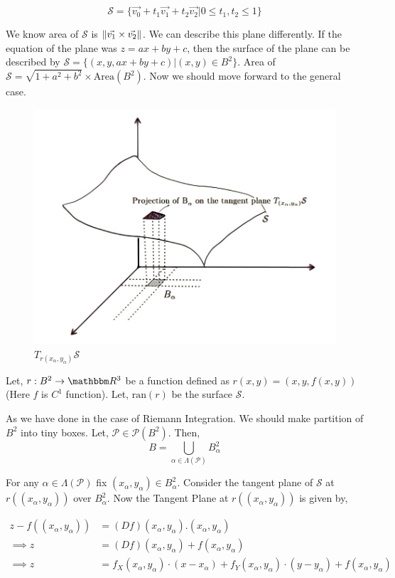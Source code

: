 \documentclass[../Analysis-3]{subfiles}
\begin{document}
$$ \mathcal{S} = \{ \vec{v_0} + t_1 \vec{v_1} +t_2 \vec{v_2}  |  0 \le t_1,t_2 \le 1\} $$

We know area of $\mathcal{S}$ is $\norm{\vec{v_1}\times \vec{v_2}}$. We can describe this plane differently. If the equation of the plane was $z=ax+by+c$, then the surface of the plane can be described by $\mathcal{S} = \{(x, y, ax+by+c) | (x,y) \in B^2 \}$. Area of $\mathcal{S} = \sqrt{1+a^2+b^2} \times \text{Area}(B^2)$. Now we should move forward to the general case.

\begin{figure}
    \centering
    \includegraphics[width=.78\linewidth]{../figures/lec-25.2.png}
    \caption{$T_{r(x_{\alpha},y_{\alpha})} \mathcal{S}$}
\end{figure}


Let, $r : B^2 \to \R^3$ be a function defined as $r(x,y) = (x,y,f(x,y))$ (Here $f$ is $C^1$ function). Let, $\text{ran}(r)$ be the surface $\mathcal{S}$.

\vspace{0.2cm}

As we have done in the case of Riemann Integration. We should make partition of $B^2$ into tiny boxes.  Let, $\mathcal{P} \in \mathscr{P}(B^2)$. Then,
\[B = \bigcup_{\alpha \in \Lambda(\mathcal{P})} B_{\alpha}^2\]

For any $\alpha \in \Lambda(\mathcal{P})$ fix $(x_{\alpha},y_{\alpha}) \in B_{\alpha}^2$. Consider the tangent plane of $\mathcal{S}$ at $r((x_{\alpha},y_{\alpha}))$ over $B_{\alpha}^2$. Now the Tangent Plane at $r((x_{\alpha},y_{\alpha}))$ is given by,

\begin{align*}
    z - f((x_{\alpha},y_{\alpha})) & = (Df)(x_{\alpha},y_{\alpha}).(x_{\alpha},y_{\alpha})                                                                             \\
    \implies z                     & = (Df)(x_{\alpha},y_{\alpha}) + f(x_{\alpha},y_{\alpha})                                                                          \\
    \implies z                     & = f_X(x_{\alpha},y_{\alpha}) \cdot (x - x_{\alpha}) +f_Y(x_{\alpha},y_{\alpha}) \cdot (y - y_{\alpha}) + f(x_{\alpha},y_{\alpha}) \\
\end{align*}
\end{document}
